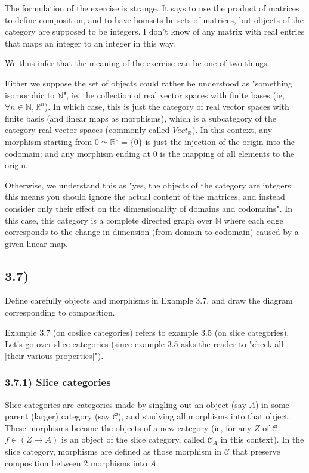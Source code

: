 \documentclass[12pt, letterpaper, twoside]{report}
\begin{document}
The formulation of the exercise is strange. It says to use the product of matrices to define composition, and to have homsets be sets of matrices, but objects of the category are supposed to be integers. I don't know of any matrix with real entries that maps an integer to an integer in this way.

We thus infer that the meaning of the exercise can be one of two things.

Either we suppose the set of objects could rather be understood as "something isomorphic to $\mathbb{N}$", ie, the collection of real vector spaces with finite bases (ie, $\forall n \in \mathbb{N}, \mathbb{R}^n$). In which case, this is just the category of real vector spaces with finite basis (and linear maps as morphisms), which is a subcategory of the category real vector spaces (commonly called $Vect_{\mathbb{R}}$). In this context, any morphism starting from $0 \simeq \mathbb{R}^0 = \{0\}$ is just the injection of the origin into the codomain; and any morphism ending at $0$ is the mapping of all elements to the origin.

Otherwise, we understand this as "yes, the objects of the category are integers: this means you should ignore the actual content of the matrices, and instead consider only their effect on the dimensionality of domains and codomains". In this case, this category is a complete directed graph over $\mathbb{N}$ where each edge corresponds to the change in dimension (from domain to codomain) caused by a given linear map.



\subsection*{3.7)}

Define carefully objects and morphisms in Example 3.7, and draw the diagram corresponding to composition.

Example 3.7 (on coslice categories) refers to example 3.5 (on slice categories). Let's go over slice categories (since example 3.5 asks the reader to "check all [their various properties]").

\subsubsection*{3.7.1) Slice categories}

Slice categories are categories made by singling out an object (say $A$) in some parent (larger) category (say $\mathcal{C}$), and studying all morphisms into that object. These morphisms become the objects of a new category (ie, for any $Z$ of $\mathcal{C}$, $f \in (Z \to A)$ is an object of the slice category, called $\mathcal{C}_A$ in this context). In the slice category, morphisms are defined as those morphism in $\mathcal{C}$ that preserve composition between 2 morphisms into $A$.
\end{document}
